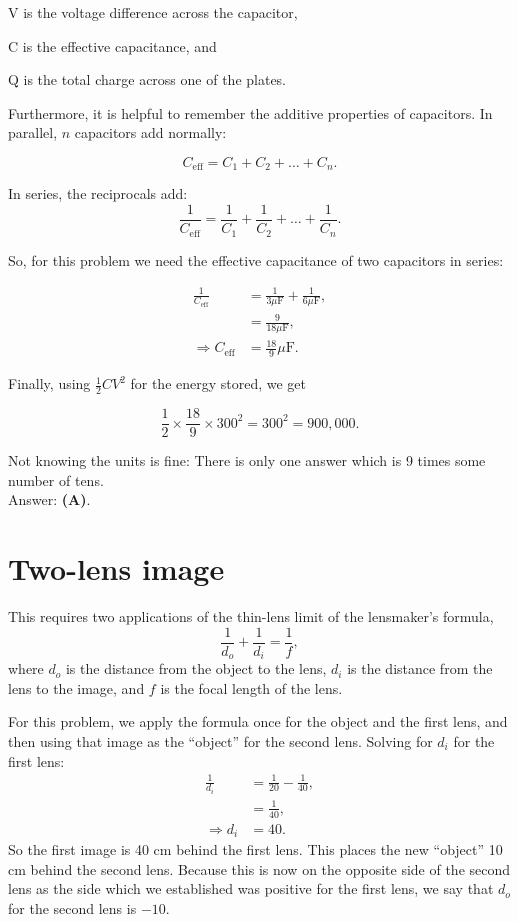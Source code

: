 \documentclass[11pt]{paper}
\newcommand{\answer}[1]{Answer: \textbf{(#1)}.}
\begin{document}
V is the voltage difference across the capacitor,

C is the effective capacitance, and

Q is the total charge across one of the plates.

Furthermore, it is helpful to remember the additive properties of capacitors.  In parallel, $n$ capacitors add normally:

\begin{equation}
C_{\text{eff}} = C_1 + C_2 + \dots + C_n.
\end{equation}

In series, the reciprocals add:
\begin{equation}
\frac{1}{C_{\text{eff}}} =\frac{1}{C_1} + \frac{1}{C_2} + \dots + \frac{1}{C_n}.
\end{equation}

So, for this problem we need the effective capacitance of two capacitors in series:

\begin{align}
\frac{1}{C_\text{eff}} &= \frac{1}{3\mu\text{F}} + \frac{1}{6\mu\text{F}},\\
&= \frac{9}{18\mu\text{F}},\\
\Rightarrow C_\text{eff} &= \frac{18}{9}\mu\text{F}.
\end{align}

Finally, using $\frac{1}{2}CV^2$ for the energy stored, we get 

\begin{equation}
\frac{1}{2} \times \frac{18}{9} \times 300^2 = 300^2 = 900,000.
\end{equation}

Not knowing the units is fine: There is only one answer which is 9 times some number of tens.\\

\answer{A}

\section{Two-lens image}

This requires two applications of the thin-lens limit of the lensmaker's formula,
\begin{equation}
\frac{1}{d_o} + \frac{1}{d_i} = \frac{1}{f},
\end{equation}
where $d_o$ is the distance from the object to the lens, $d_i$ is the distance from the lens to the image, and $f$ is the focal length of the lens.

For this problem, we apply the formula once for the object and the first lens, and then using that image as the ``object'' for the second lens.  Solving for $d_i$ for the first lens:
\begin{align}
\frac{1}{d_i} &= \frac{1}{20} - \frac{1}{40},\\
&= \frac{1}{40},\\
\Rightarrow d_i &= 40.
\end{align}
So the first image is 40 cm behind the first lens.  This places the new ``object'' 10 cm behind the second lens.  Because this is now on the opposite side of the second lens as the side which we established was positive for the first lens, we say that $d_o$ for the second lens is $-10$.
\end{document}
